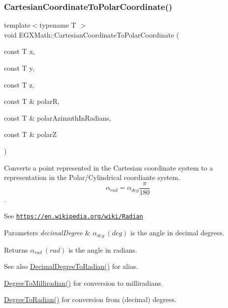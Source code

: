 \subsubsection{\texorpdfstring{Cartesian\+Coordinate\+To\+Polar\+Coordinate()}{CartesianCoordinateToPolarCoordinate()}}
{\footnotesize\ttfamily template$<$typename T $>$ \\
void E\+G\+X\+Math\+::\+Cartesian\+Coordinate\+To\+Polar\+Coordinate (\begin{DoxyParamCaption}\item[{const T}]{x,  }\item[{const T}]{y,  }\item[{const T}]{z,  }\item[{const T \&}]{polarR,  }\item[{const T \&}]{polar\+Azimuth\+In\+Radians,  }\item[{const T \&}]{polarZ }\end{DoxyParamCaption})}



Converts a point represented in the Cartesian coordinate system to a representation in the Polar/\+Cylindrical coordiante system. \[\alpha_{rad}=\alpha_{deg}\frac{\pi}{180}\]. 

See \href{https://en.wikipedia.org/wiki/Radian}{\tt https\+://en.\+wikipedia.\+org/wiki/\+Radian} 
\begin{DoxyParams}{Parameters}
{\em decimal\+Degree} & $\alpha_{deg}\ (deg)$ is the angle in decimal degrees. \\
\hline
\end{DoxyParams}
\begin{DoxyReturn}{Returns}
$\alpha_{rad}\ (rad)$ is the angle in radians. 
\end{DoxyReturn}
\begin{DoxySeeAlso}{See also}
\mbox{\hyperlink{group___e_g_x_math-_conversions-_angle_conversions-_decimal_degree_ga906ee2c83cdf4caa59eb613dc2d5d52a}{Decimal\+Degree\+To\+Radian()}} for alias. 

\mbox{\hyperlink{group___e_g_x_math-_conversions-_angle_conversions-_degree_gae4fa6c2d3805430760783650cfbfdb11}{Degree\+To\+Milliradian()}} for conversion to milliradians. 

\mbox{\hyperlink{group___e_g_x_math-_conversions-_angle_conversions-_degree_ga48585541b228c852c9d08a9eac3682f0}{Degree\+To\+Radian()}} for conversion from (decimal) degrees. 
\end{DoxySeeAlso}
